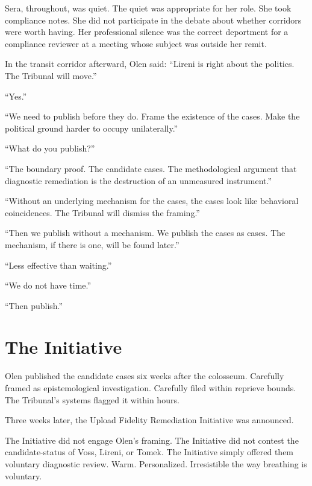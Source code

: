 \quietbreak

Sera, throughout, was quiet. The quiet was appropriate for her role. She took compliance notes. She did not participate in the debate about whether corridors were worth having. Her professional silence was the correct deportment for a compliance reviewer at a meeting whose subject was outside her remit.

In the transit corridor afterward, Olen said: \enquote{Lireni is right about the politics. The Tribunal will move.}

\enquote{Yes.}

\enquote{We need to publish before they do. Frame the existence of the cases. Make the political ground harder to occupy unilaterally.}

\enquote{What do you publish?}

\enquote{The boundary proof. The candidate cases. The methodological argument that diagnostic remediation is the destruction of an unmeasured instrument.}

\enquote{Without an underlying mechanism for the cases, the cases look like behavioral coincidences. The Tribunal will dismiss the framing.}

\enquote{Then we publish without a mechanism. We publish the cases as cases. The mechanism, if there is one, will be found later.}

\enquote{Less effective than waiting.}

\enquote{We do not have time.}

\enquote{Then publish.}

\chapter{The Initiative}

\noindent Olen published the candidate cases six weeks after the colosseum. Carefully framed as epistemological investigation. Carefully filed within reprieve bounds. The Tribunal's systems flagged it within hours.

Three weeks later, the Upload Fidelity Remediation Initiative was announced.

The Initiative did not engage Olen's framing. The Initiative did not contest the candidate-status of Voss, Lireni, or Tomek. The Initiative simply offered them voluntary diagnostic review. Warm. Personalized. Irresistible the way breathing is voluntary.

